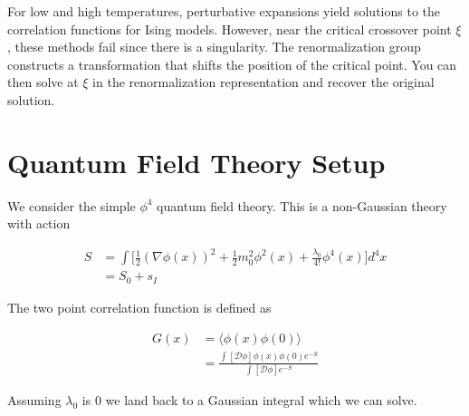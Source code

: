 \documentclass[book.tex]{subfiles}
\begin{document}
For low and high temperatures, perturbative expansions yield solutions to the correlation functions for Ising models. However, near the critical crossover point $\xi$, these methods fail since there is a singularity. The renormalization group constructs a transformation that shifts the position of the critical point. You can then solve at $\xi$ in the renormalization representation and recover the original solution.


\section{Quantum Field Theory Setup}

We consider the simple $\phi^4$ quantum field theory. This is a non-Gaussian theory with action

\begin{align}
    S &= \int \Bigg [ \frac{1}{2}(\nabla \phi(x))^2 + \frac{1}{2}m_0^2 \phi^2(x) + \frac{\lambda_0}{4!}\phi^4(x) \Bigg ] d^4 x \\
    &= S_0 + s_I
\end{align}

The two point correlation function is defined as 

\begin{align}
    G(x) &= \langle \phi(x)\phi(0) \rangle \\
    &= \frac{\int[\mathcal{D}\phi] \phi(x) \phi(0) e^{-S}}{\int [\mathcal{D}\phi] e^{-S}}
\end{align}

Assuming $\lambda_0$ is $0$ we land back to a Gaussian integral which we can solve. %

\end{document}
